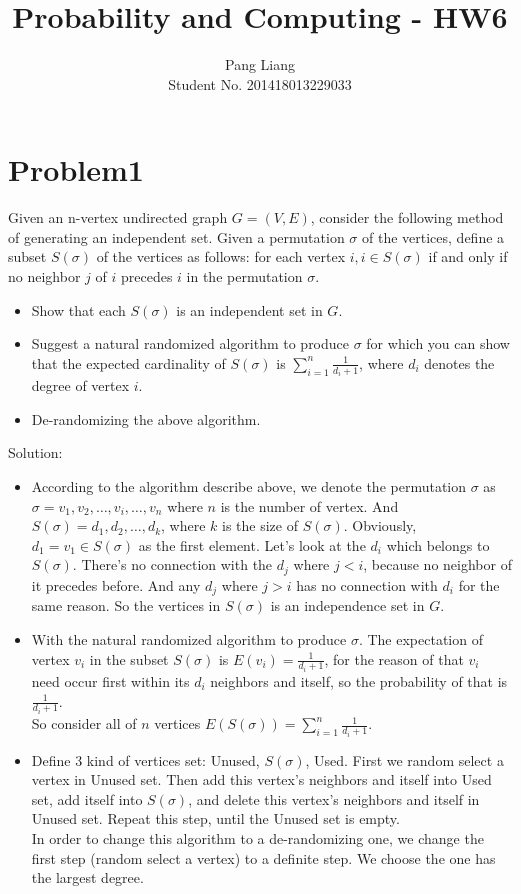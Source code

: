 \documentclass[12pt]{article}
\title{Probability and Computing - HW6}
\author{Pang Liang\\ Student No. 201418013229033}
\begin{document}
\maketitle

\section{Problem1}
Given an n-vertex undirected graph $G = (V, E)$, consider the following method of generating an independent set. Given a permutation $\sigma$ of the vertices, define a subset $S(\sigma)$ of the vertices as follows: for each vertex $i, i \in S(\sigma)$ if and only if no neighbor $j$ of $i$ precedes $i$ in the permutation $\sigma$.

\begin{itemize}
\item Show that each $S(\sigma)$ is an independent set in $G$.
\item Suggest a natural randomized algorithm to produce $\sigma$ for which you can show that the expected cardinality of $S(\sigma)$ is $\sum_{i=1}^{n} \frac{1}{d_i+1}$, where $d_i$ denotes the degree of vertex $i$.
\item De-randomizing the above algorithm.
\end{itemize}

Solution:\\
\begin{itemize}
\item
According to the algorithm describe above, we denote the permutation $\sigma$ as $\sigma = {v_1, v_2, \dots, v_i, \dots, v_n}$ where $n$ is the number of vertex. And $S(\sigma)={d_1, d_2, \dots, d_k}$, where $k$ is the size of $S(\sigma)$. Obviously, $d_1 = v_1 \in S(\sigma)$ as the first element. Let's look at the $d_i$ which belongs to $S(\sigma)$. There's no connection with the $d_j$ where $j<i$, because no neighbor of it precedes before. And any $d_j$ where $j>i$ has no connection with $d_i$ for the same reason. So the vertices in $S(\sigma)$ is an independence set in $G$.

\item
With the natural randomized algorithm to produce $\sigma$. The expectation of vertex $v_i$ in the subset $S(\sigma)$ is $E(v_i) = \frac{1}{d_i+1}$, for the reason of that $v_i$ need occur first within its $d_i$ neighbors and itself, so the probability of that is $\frac{1}{d_i+1}$.\\
So consider all of $n$ vertices $E(S(\sigma)) = \sum_{i=1}^{n} \frac{1}{d_i+1}$.

\item
Define 3 kind of vertices set: Unused, $S(\sigma)$, Used. First we random select a vertex in Unused set. Then add this vertex's neighbors and itself into Used set, add itself into $S(\sigma)$, and delete this vertex's neighbors and itself in Unused set. Repeat this step, until the Unused set is empty.\\
In order to change this algorithm to a de-randomizing one, we change the first step (random select a vertex) to a definite step. We choose the one has the largest degree.

\end{itemize}
\end{document}
